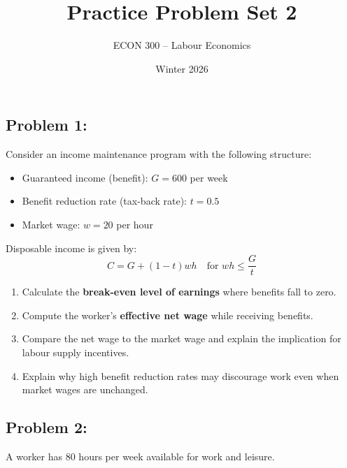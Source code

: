 \documentclass[12pt]{article}
\title{Practice Problem Set 2}
\author{ECON 300 -- Labour Economics}
\date{Winter 2026}
\begin{document}
\maketitle





\subsection*{Problem 1:}

Consider an income maintenance program with the following structure:

\begin{itemize}
\item Guaranteed income (benefit): \( G = 600 \) per week  
\item Benefit reduction rate (tax-back rate): \( t = 0.5 \)  
\item Market wage: \( w = 20 \) per hour  
\end{itemize}

Disposable income is given by:
\[
C = G + (1 - t)wh
\quad \text{for } wh \leq \frac{G}{t}
\]

\begin{enumerate}
\item Calculate the \textbf{break-even level of earnings} where benefits fall to zero.
\item Compute the worker’s \textbf{effective net wage} while receiving benefits.
\item Compare the net wage to the market wage and explain the implication for labour supply incentives.
\item Explain why high benefit reduction rates may discourage work even when market wages are unchanged.
\end{enumerate}

\subsection*{Problem 2: }

A worker has 80 hours per week available for work and leisure.
\end{document}
